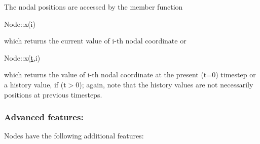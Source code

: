 The nodal positions are accessed by the member function 
\begin{DoxyCode}
Node::x(i) 
\end{DoxyCode}
 which returns the current value of i-\/th nodal coordinate or 
\begin{DoxyCode}
Node::x(\hyperlink{cfortran_8h_af6f0bd3dc13317f895c91323c25c2b8f}{t},i) 
\end{DoxyCode}
 which returns the value of i-\/th nodal coordinate at the present (t=0) timestep or a history value, if (t$>$0); again, note that the history values are not necessarily positions at previous timesteps.\hypertarget{index_advanced_features_of_nodes}{}\subsubsection{Advanced features\+:}\label{index_advanced_features_of_nodes}
{\ttfamily Nodes} have the following additional features\+:


